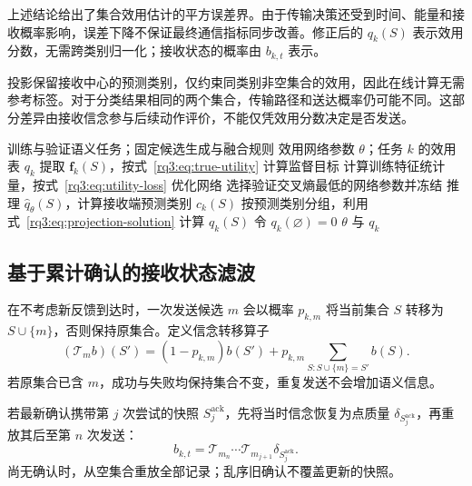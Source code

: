 上述结论给出了集合效用估计的平方误差界。由于传输决策还受到时间、能量和接收概率影响，误差下降不保证最终通信指标同步改善。修正后的 $q_k(S)$ 表示效用分数，无需跨类别归一化；接收状态的概率由 $b_{k,t}$ 表示。

投影保留接收中心的预测类别，仅约束同类别非空集合的效用，因此在线计算无需参考标签。对于分类结果相同的两个集合，传输路径和送达概率仍可能不同。这部分差异由接收信念参与后续动作评价，不能仅凭效用分数决定是否发送。

\begin{algorithm}[H]
  \label{rq3:alg:utility}
  \small
  \begin{algorithmic}[1]
    \Require 训练与验证语义任务；固定候选生成与融合规则
    \Ensure 效用网络参数 $\theta$；任务 $k$ 的效用表 $q_k$
      \State 提取 $\bm f_k(S)$，按式~\eqref{rq3:eq:true-utility} 计算监督目标
    \EndFor
    \State 计算训练特征统计量，按式~\eqref{rq3:eq:utility-loss} 优化网络
    \State 选择验证交叉熵最低的网络参数并冻结
      \State 推理 $\hat q_\theta(S)$，计算接收端预测类别 $c_k(S)$
    \EndFor
    \State 按预测类别分组，利用式~\eqref{rq3:eq:projection-solution} 计算 $q_k(S)$
    \State 令 $q_k(\varnothing)=0$
    \State \Return $\theta$ 与 $q_k$
  \end{algorithmic}
\end{algorithm}

\subsection{基于累计确认的接收状态滤波}
\label{rq3:subsec:filter}

在不考虑新反馈到达时，一次发送候选 $m$ 会以概率 $p_{k,m}$ 将当前集合 $S$ 转移为 $S\cup\{m\}$，否则保持原集合。定义信念转移算子
\begin{equation}
  (\mathcal T_m b)(S')=(1-p_{k,m})b(S')
   +p_{k,m}\sum_{S:S\cup\{m\}=S'}b(S).
  \label{rq3:eq:belief-transition}
\end{equation}
若原集合已含 $m$，成功与失败均保持集合不变，重复发送不会增加语义信息。

若最新确认携带第 $j$ 次尝试的快照 $S_j^{\mathrm{ack}}$，先将当时信念恢复为点质量 $\delta_{S_j^{\mathrm{ack}}}$，再重放其后至第 $n$ 次发送：
\begin{equation}
  b_{k,t}=\mathcal T_{m_n}\cdots\mathcal T_{m_{j+1}}
          \delta_{S_j^{\mathrm{ack}}}.
  \label{rq3:eq:ack-replay}
\end{equation}
尚无确认时，从空集合重放全部记录；乱序旧确认不覆盖更新的快照。


